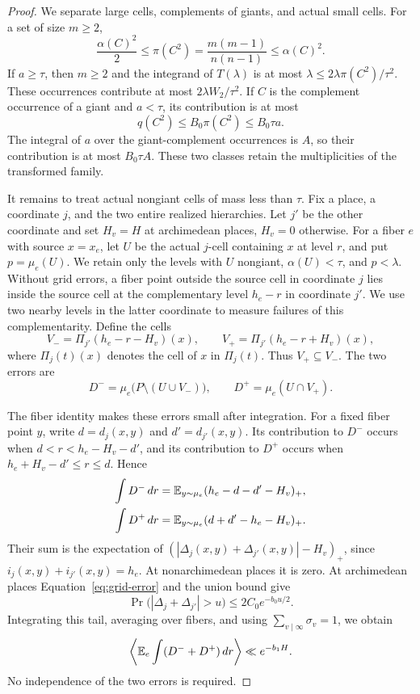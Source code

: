 \begin{proof}
We separate large cells, complements of giants, and actual small cells.
For a set of size $m\ge2$,
\begin{equation}\label{eq:sc-pair-comparison}
 \frac{\alpha(C)^2}{2}
 \le \pi(C^2)=\frac{m(m-1)}{n(n-1)}
 \le\alpha(C)^2.
\end{equation}
If $a\ge\tau$, then $m\ge2$ and the integrand of $T(\lambda)$ is
at most $\lambda\le2\lambda\pi(C^2)/\tau^2$.  These occurrences
contribute at most $2\lambda W_2/\tau^2$.
If $C$ is the complement occurrence of a giant and $a<\tau$, its
contribution is at most
\[
 q(C^2)\le B_0\pi(C^2)\le B_0\tau a.
\]
The integral of $a$ over the giant-complement occurrences is $A$,
so their contribution is at most $B_0\tau A$.
These two classes retain the multiplicities of the transformed family.

It remains to treat actual nongiant cells of mass less than $\tau$.
Fix a place, a coordinate $j$, and the two entire realized hierarchies.
Let $j'$ be the other coordinate and set $H_v=H$ at archimedean places,
$H_v=0$ otherwise.  For a fiber $e$ with source $x=x_e$, let $U$
be the actual $j$-cell containing $x$ at level $r$, and put
$p=\mu_e(U)$.  We retain only the levels with $U$ nongiant,
$\alpha(U)<\tau$, and $p<\lambda$.
Without grid errors, a fiber point outside the source cell in coordinate
$j$ lies inside the source cell at the complementary level $h_e-r$ in
coordinate $j'$.  We use two nearby levels in the latter coordinate to
measure failures of this complementarity.  Define the cells
\[
 V_-=\Pi_{j'}(h_e-r-H_v)(x),\qquad
 V_+=\Pi_{j'}(h_e-r+H_v)(x),
\]
where $\Pi_j(t)(x)$ denotes the cell of $x$ in $\Pi_j(t)$.
Thus $V_+\subseteq V_-$.  The two errors are
\[
 D^-=\mu_e\bigl(P\setminus(U\cup V_-)\bigr),\qquad
 D^+=\mu_e(U\cap V_+).
\]

The fiber identity makes these errors small after integration.  For a
fixed fiber point $y$, write $d=d_j(x,y)$ and $d'=d_{j'}(x,y)$.
Its contribution to $D^-$ occurs when
$d<r<h_e-H_v-d'$, and its contribution to $D^+$ occurs when
$h_e+H_v-d'\le r\le d$.  Hence
\begin{align*}
 \int D^-\,dr&=\mathbb E_{y\sim\mu_e}(h_e-d-d'-H_v)_+,\\
 \int D^+\,dr&=\mathbb E_{y\sim\mu_e}(d+d'-h_e-H_v)_+.
\end{align*}
Their sum is the expectation of
$(|\Delta_j(x,y)+\Delta_{j'}(x,y)|-H_v)_+$, since
$i_j(x,y)+i_{j'}(x,y)=h_e$.  At nonarchimedean places it is zero.
At archimedean places Equation~\eqref{eq:grid-error} and the union bound
give
\[
 \Pr\bigl(|\Delta_j+\Delta_{j'}|>u\bigr)
 \le2C_0e^{-b_0u/2}.
\]
Integrating this tail, averaging over fibers, and using
$\sum_{v\mid\infty}\sigma_v=1$, we obtain
\begin{equation}\label{eq:sc-errors}
 \left\langle \mathbb E_e\int(D^-+D^+)\,dr\right\rangle\ll e^{-b_1H}.
\end{equation}
No independence of the two errors is required.


\end{proof}
